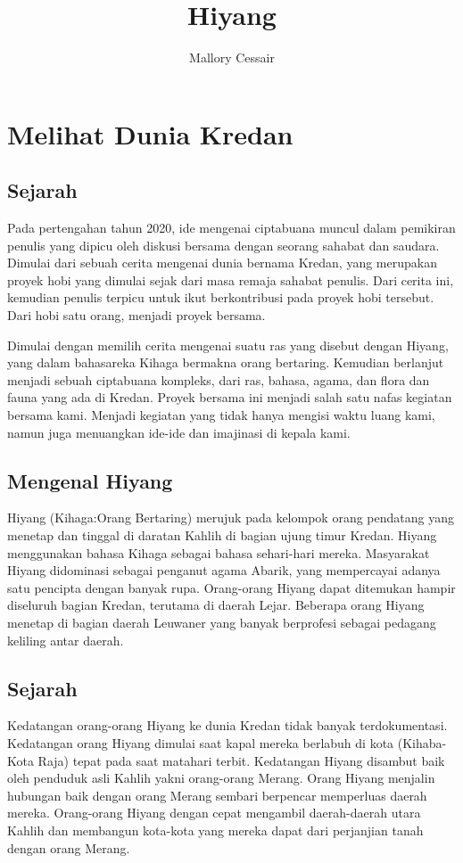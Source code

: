 \documentclass[12pt]{report}
\title{Hiyang}
\author{Mallory Cessair}
\begin{document}
\maketitle

\chapter{Melihat Dunia Kredan}
\section{Sejarah}
Pada pertengahan tahun 2020, ide mengenai ciptabuana muncul dalam pemikiran penulis yang dipicu oleh diskusi bersama dengan seorang sahabat dan saudara. Dimulai dari sebuah cerita mengenai dunia bernama Kredan, yang merupakan proyek hobi yang dimulai sejak dari masa remaja sahabat penulis. Dari cerita ini, kemudian penulis terpicu untuk ikut berkontribusi pada proyek hobi tersebut. Dari hobi satu orang, menjadi proyek bersama. 

Dimulai dengan memilih cerita mengenai suatu ras yang disebut dengan Hiyang, yang dalam bahasareka Kihaga bermakna orang bertaring. Kemudian berlanjut menjadi sebuah ciptabuana kompleks, dari ras, bahasa, agama, dan flora dan fauna yang ada di Kredan. Proyek bersama ini menjadi salah satu nafas kegiatan bersama kami. Menjadi kegiatan yang tidak hanya mengisi waktu luang kami, namun juga menuangkan ide-ide dan imajinasi di kepala kami.

\section{Mengenal Hiyang}
Hiyang (Kihaga:Orang Bertaring) merujuk pada kelompok orang pendatang yang menetap dan tinggal di daratan Kahlih di bagian ujung timur Kredan. Hiyang menggunakan bahasa Kihaga sebagai bahasa sehari-hari mereka. Masyarakat Hiyang didominasi sebagai penganut agama Abarik, yang mempercayai adanya satu pencipta dengan banyak rupa. Orang-orang Hiyang dapat ditemukan hampir diseluruh bagian Kredan, terutama di daerah Lejar. Beberapa orang Hiyang menetap di bagian daerah Leuwaner yang banyak berprofesi sebagai pedagang keliling antar daerah.

\section{Sejarah}
Kedatangan orang-orang Hiyang ke dunia Kredan tidak banyak terdokumentasi. Kedatangan orang Hiyang dimulai saat kapal mereka berlabuh di kota (Kihaba-Kota Raja) tepat pada saat matahari terbit. Kedatangan Hiyang disambut baik oleh penduduk asli Kahlih yakni orang-orang Merang. Orang Hiyang menjalin hubungan baik dengan orang Merang sembari berpencar memperluas daerah mereka. Orang-orang Hiyang dengan cepat mengambil daerah-daerah utara Kahlih dan membangun kota-kota yang mereka dapat dari perjanjian tanah dengan orang Merang.
\end{document}

